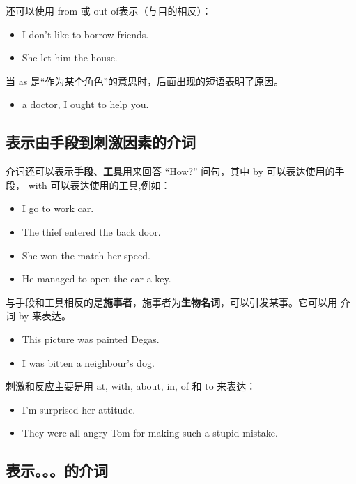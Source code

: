 还可以使用 from 或 out of表示（与目的相反）：
\begin{itemize}
\item I don't like to borrow  friends.

\item She let him  the house.
\end{itemize}

当 as 是“作为某个角色”的意思时，后面出现的短语表明了原因。
\begin{itemize}
\item {} a doctor, I ought to help you.
\end{itemize}

\subsection{表示由手段到刺激因素的介词}

介词还可以表示\textbf{手段}、\textbf{工具}用来回答 ``How?'' 问句，其中 by 可以表达使用的手
段， with 可以表达使用的工具,例如：
\begin{itemize}
\item I go to work  car.
\item The thief entered  the back door.
\item She won the match  her speed.
\item He managed to open the car  a key.
\end{itemize}

与手段和工具相反的是\textbf{施事者}，施事者为\textbf{生物名词}，可以引发某事。它可以用
介词 by 来表达。
\begin{itemize}
\item This picture was painted  Degas.

\item I was bitten  a neighbour's dog.
\end{itemize}

刺激和反应主要是用 at, with, about, in, of 和 to 来表达：
\begin{itemize}
\item I'm surprised  her attitude.

\item They were all angry  Tom for making such a stupid mistake.

\end{itemize}

\subsection{表示。。。的介词}

